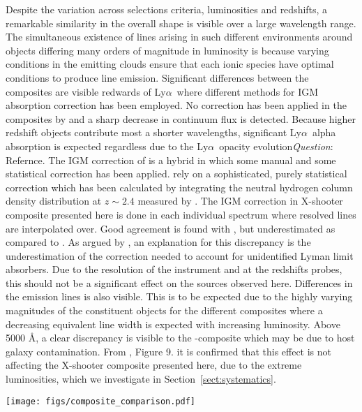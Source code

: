 \documentclass{aa}    %
\newcommand{\figlabel}[1]{\label{fig:#1}}
\newcommand{\sectionname}{Section}
\newcommand{\Sect}[1]{\sectionname~\ref{sect:#1}}
\newcommand{\sect}[1]{\Sect{#1}}
\newcommand{\lya}{Ly$\alpha$}
\newcommand{\todo}[3]{{\color{#2}\emph{#1}: #3}}
\newcommand{\qtodo}[1]{\todo{Question}{red}{#1}}
\begin{document}
Despite the variation across selections criteria, luminosities and redshifts, a remarkable similarity in the overall shape is visible over a large wavelength range. The simultaneous existence of lines arising in such different environments around objects differing many orders of magnitude in luminosity is because varying conditions in the emitting clouds ensure that each ionic species have optimal conditions to produce line emission\citep{Baldwin1995}.  Significant differences between the composites are visible redwards of \lya~where different methods for IGM absorption correction has been employed. No correction has been applied in the composites by \citet{Francis1991, VandenBerk2001} and a sharp decrease in continuum flux is detected. Because higher redshift objects contribute most a shorter wavelengths, significant \lya~alpha absorption is expected regardless due to the \lya~opacity evolution\qtodo{Refernce}. The IGM correction of \citet{Telfer2002} is a hybrid in which some manual and some statistical correction has been applied. \citet{Lusso2015} rely on a sophisticated, purely statistical correction which has been calculated by integrating the neutral hydrogen column density distribution at $z \sim 2.4$ measured by \cite{Prochaska2014b}. The IGM correction in X-shooter composite presented here is done in each individual spectrum where resolved lines are interpolated over. Good agreement is found with \cite{Telfer2002}, but underestimated as compared to \cite{Lusso2015}. As argued by \cite{Lusso2015}, an explanation for this discrepancy is the underestimation of the correction needed to account for unidentified Lyman limit absorbers. Due to the resolution of the instrument and at the redshifts probes, this should not be a significant effect on the sources observed here. 
Differences in the emission lines is also visible. This is to be expected due to the highly varying magnitudes of the constituent objects for the different composites where a decreasing equivalent line width is expected with increasing luminosity\citep{Baldwin1977}. 
Above 5000 \AA, a clear discrepancy is visible to the \cite{VandenBerk2001}-composite which may be due to host galaxy contamination\citep{Glikman2006}. From \cite{Shen2011}, Figure 9. it is confirmed that this effect is not affecting the X-shooter composite presented here, due to the extreme luminosities, which we investigate in \sect{systematics}.
 \begin{figure*}[t!]
   \centering
   \texttt{[image: figs/composite\_comparison.pdf]}
   \caption[]{Comparison of different composites. The composites by \citet{Lusso2015, VandenBerk2001, Telfer2002, Francis1991} are normalized to the X-shooter composite at $\sim 1450$ \AA~and the composite by \citet{Glikman2006} is normalized to ours at $\sim 3850$ \AA. Significant differences is visible blueward of \lya~due to differing IGM correction methods. Above 5000 \AA~ significant host galaxy contamination is visible in the composite by \citet{VandenBerk2001}. Overplot in blue is a pure power law with slope $\alpha = -1.7$ and normalized at $\sim 1450$ \AA.}
  \figlabel{composite_comparison}
 \end{figure*}
\end{document}
